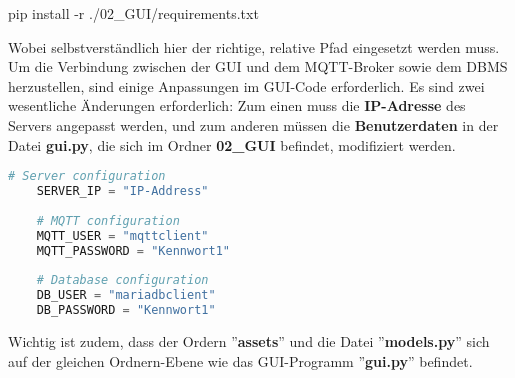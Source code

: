 \begin{Textfeld1}
	pip install -r ./02\_GUI/requirements.txt
\end{Textfeld1}

Wobei selbstverständlich hier der richtige, relative Pfad eingesetzt werden muss.
Um die Verbindung zwischen der \ac{GUI} und dem MQTT-Broker sowie dem \ac{DBMS} herzustellen, sind einige Anpassungen im \ac{GUI}-Code erforderlich. Es sind zwei wesentliche Änderungen erforderlich: Zum einen muss die \textbf{IP-Adresse} des Servers angepasst werden, und zum anderen müssen die \textbf{Benutzerdaten} in der Datei \textbf{gui.py}, die sich im Ordner \textbf{02\_GUI} befindet,  modifiziert werden. 

\begin{lstlisting}[language=Python]
	# Server configuration
	SERVER_IP = "IP-Address"       
	
	# MQTT configuration
	MQTT_USER = "mqttclient"       
	MQTT_PASSWORD = "Kennwort1"    
	
	# Database configuration
	DB_USER = "mariadbclient"      
	DB_PASSWORD = "Kennwort1"      
\end{lstlisting}

Wichtig ist zudem, dass der Ordern ''\textbf{assets}'' und die Datei ''\textbf{models.py}'' sich auf der gleichen Ordnern-Ebene wie das \ac{GUI}-Programm ''\textbf{gui.py}'' befindet.




